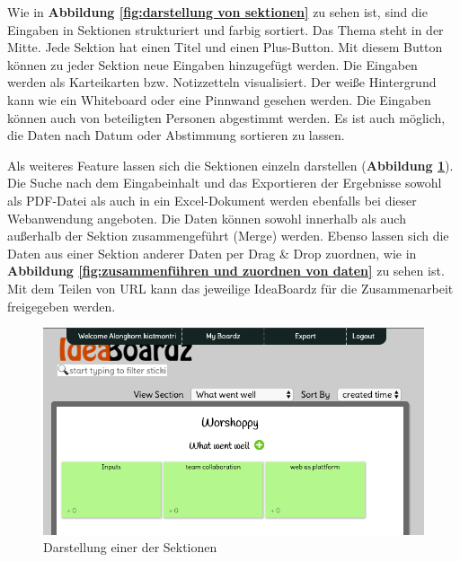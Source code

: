 Wie in \textbf{Abbildung \ref{fig:darstellung von sektionen}} zu sehen ist, sind die Eingaben in Sektionen strukturiert und farbig sortiert. Das Thema steht in der Mitte. Jede Sektion hat einen Titel und einen Plus-Button. Mit diesem Button können zu jeder Sektion neue Eingaben hinzugefügt werden. Die Eingaben werden als Karteikarten bzw. Notizzetteln visualisiert. Der weiße Hintergrund kann wie ein Whiteboard oder eine Pinnwand gesehen werden. Die Eingaben können auch von beteiligten Personen abgestimmt werden. Es ist auch möglich, die Daten nach Datum oder Abstimmung sortieren zu lassen.\bigskip

Als weiteres Feature lassen sich die Sektionen einzeln darstellen (\textbf{Abbildung \ref{fig:darstellung einer der sektionen}}). Die Suche nach dem Eingabeinhalt und das Exportieren der Ergebnisse sowohl als PDF-Datei als auch in ein Excel-Dokument werden ebenfalls bei dieser Webanwendung angeboten. Die Daten können sowohl innerhalb als auch außerhalb der Sektion zusammengeführt (Merge) werden. Ebenso lassen sich die Daten aus einer Sektion anderer Daten per Drag \& Drop zuordnen, wie in \textbf{Abbildung \ref{fig:zusammenführen und zuordnen von daten}} zu sehen ist. Mit dem Teilen von URL kann das jeweilige IdeaBoardz für die Zusammenarbeit freigegeben werden.

\begin{figure}[H]
  \begin{center}
    \includegraphics[scale=0.4]{img/ideaBoardz3}
	\caption{Darstellung einer der Sektionen} 
	\label{fig:darstellung einer der sektionen}
  \end{center}   
\end{figure}


